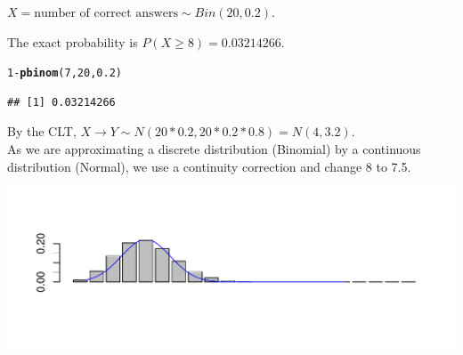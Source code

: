 \documentclass[bigtut]{tutorial}\usepackage[]{graphicx}\usepackage[]{color}
\makeatletter
\def\maxwidth{ %
  \ifdim\Gin@nat@width>\linewidth
    \linewidth
  \else
    \Gin@nat@width
  \fi
}
\newcommand{\hlnum}[1]{\textcolor[rgb]{0.686,0.059,0.569}{#1}}%
\newcommand{\hlopt}[1]{\textcolor[rgb]{0,0,0}{#1}}%
\newcommand{\hlstd}[1]{\textcolor[rgb]{0.345,0.345,0.345}{#1}}%
\newcommand{\hlkwd}[1]{\textcolor[rgb]{0.737,0.353,0.396}{\textbf{#1}}}%
\newenvironment{kframe}{%
 \def\at@end@of@kframe{}%
 \ifinner\ifhmode%
  \def\at@end@of@kframe{\end{minipage}}%
  \begin{minipage}{\columnwidth}%
 \fi\fi%
 \def\FrameCommand##1{\hskip\@totalleftmargin \hskip-\fboxsep
 \colorbox{shadecolor}{##1}\hskip-\fboxsep
     \hskip-\linewidth \hskip-\@totalleftmargin \hskip\columnwidth}%
 \MakeFramed {\advance\hsize-\width
   \@totalleftmargin\z@ \linewidth\hsize
   \@setminipage}}%
 {\par\unskip\endMakeFramed%
 \at@end@of@kframe}
\newenvironment{knitrout}{}{} %
\makeatother
\begin{document}
\begin{tutorial}
\begin{questions}


\begin{solution}

\begin{parts}
\item
$X = \text{number of correct answers} \sim Bin(20,0.2)$. \\

\item 
The exact probability is $P(X \geq 8) = 0.03214266$.
\begin{knitrout}
\color{fgcolor}\begin{kframe}
\begin{alltt}
\hlnum{1}\hlopt{-}\hlkwd{pbinom}\hlstd{(}\hlnum{7}\hlstd{,}\hlnum{20}\hlstd{,}\hlnum{0.2}\hlstd{)}
\end{alltt}
\begin{verbatim}
## [1] 0.03214266
\end{verbatim}
\end{kframe}
\end{knitrout}

\vspace{.5cm}
\item 
By the CLT, $X \rightarrow Y \sim N(20*0.2, 20*0.2*0.8) = N(4,3.2)$. \\

As we are approximating a discrete distribution (Binomial) by a continuous distribution (Normal), we use a continuity correction and  change 8 to 7.5.

\begin{knitrout}
\color{fgcolor}
\includegraphics[width=\maxwidth]{figure/unnamed-chunk-9-1} 


\end{knitrout}
\end{parts}
\end{solution}
\end{questions}
\end{tutorial}
\end{document}
